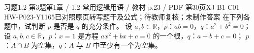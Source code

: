 \par\noindent\begin{minipage}{\linewidth}
\begin{bankitem}{习题1.2 第3题}{第1章 / 1.2 常用逻辑用语 / 教材 p.23 / PDF 第30页}{XJ-B1-C01-HW-P023-Y1165}{已对照原页转写题干及公式；待教师复核；未制作答案}
在下列各题中，试判断 $p$ 是否是 $q$ 的充分条件。
设 $a,b\in\mathbb R$，$p$：$ab=0$，$q$：$a^2+b^2=0$；
设 $a,b,c\in\mathbb R$，$p$：$x=1$ 是方程 $ax^2+bx+c=0$ 的一个根，$q$：$a+b+c=0$；
$p$：$A\cap B$ 为空集，$q$：$A$ 与 $B$ 中至少有一个为空集。
\end{bankitem}
\end{minipage}\par\medskip
